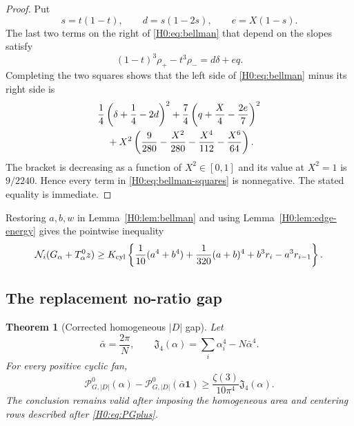 \documentclass[11pt]{amsart}
\numberwithin{equation}{section}
\newtheorem{theorem}{Theorem}[section]
\theoremstyle{definition}
\theoremstyle{remark}
\newcommand{\Jfour}{\mathfrak J_4}
\newcommand{\PGdot}{\mathcal P_{G,|D|}^0}
\begin{document}
\begin{proof}
Put
\begin{equation}
 s=t(1-t),\qquad
 d=s(1-2s),\qquad e=X(1-s).
\end{equation}
The last two terms on the right of \eqref{H0:eq:bellman} that depend on the
slopes satisfy
\begin{equation}
 (1-t)^3\rho_+-t^3\rho_-=d\delta+eq.
\end{equation}
Completing the two squares shows that the left side of
\eqref{H0:eq:bellman} minus its right side is
\begin{align}
 &\frac14\left(\delta+\frac14-2d\right)^2
 +\frac74\left(q+\frac X4-\frac{2e}{7}\right)^2\notag\\
 &\quad+X^2\left(
 \frac9{280}-\frac{X^2}{280}
 -\frac{X^4}{112}-\frac{X^6}{64}\right).
 \label{H0:eq:bellman-squares}
\end{align}
The bracket is decreasing as a function of $X^2\in[0,1]$ and its value at
$X^2=1$ is $9/2240$.  Hence every term in
\eqref{H0:eq:bellman-squares} is nonnegative.  The stated equality is immediate.
\end{proof}

Restoring $a,b,w$ in Lemma~\ref{H0:lem:bellman} and using
Lemma~\ref{H0:lem:edge-energy} gives the pointwise inequality
\begin{equation}\label{H0:eq:physical-bellman}
 \mathcal N_i(G_\alpha+T_\alpha^0z)
 \ge K_{\rm cyl}\left\{\frac1{10}(a^4+b^4)
 +\frac1{320}(a+b)^4+b^3r_i-a^3r_{i-1}\right\}.
\end{equation}

\subsection{The replacement no-ratio gap}

\begin{theorem}[Corrected homogeneous $|D|$ gap]\label{H0:thm:dot-gap}
Let
\begin{equation}
 \bar\alpha=\frac{2\pi}{N},
 \qquad
 \Jfour(\alpha)=\sum_i\alpha_i^4-N\bar\alpha^4.
\end{equation}
For every positive cyclic fan,
\begin{equation}\label{H0:eq:gap}
 \boxed{
 \PGdot(\alpha)-\PGdot(\bar\alpha\mathbf1)
 \ge\frac{\zeta(3)}{10\pi^4}\Jfour(\alpha).}
\end{equation}
The conclusion remains valid after imposing the homogeneous area and
centering rows described after \eqref{H0:eq:PGplus}.
\end{theorem}
\end{document}

